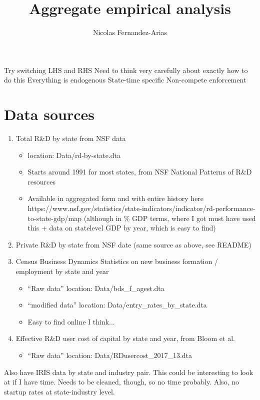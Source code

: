 \documentclass[7pt,english]{article}
\theoremstyle{remark}
\begin{document}
\title{Aggregate empirical analysis}
\author{Nicolas Fernandez-Arias}
\maketitle

Try switching LHS and RHS
Need to think very carefully about exactly how to do this
Everything is endogenous
State-time specific Non-compete enforcement 

\section{Data sources}

\begin{enumerate}
	\item Total R\&D by state from NSF data
	\begin{itemize}
		\item location: Data/rd-by-state.dta
		\item Starts around 1991 for most states, from NSF National Patterns of R\&D resources
		\item Available in aggregated form and with entire history here https://www.nsf.gov/statistics/state-indicators/indicator/rd-performance-to-state-gdp/map (although in \% GDP terms, where I got must have used this + data on statelevel GDP by year, which is easy to find)
	\end{itemize}
	\item Private R\&D by state from NSF date (same source as above, see README)
	\item Census Business Dynamics Statistics on new business formation / employment by state and year
	\begin{itemize}
		\item ``Raw data'' location: Data/bds\_f\_agest.dta
		\item ``modified data'' location: Data/entry\_rates\_by\_state.dta
		\item Easy to find online I think...
	\end{itemize}
	\item Effective R\&D user cost of capital by state and year, from Bloom et al.
	\begin{itemize}
		\item ``Raw data'' location: Data/RDusercost\_2017\_13.dta
	\end{itemize}
\end{enumerate}

Also have IRIS data by state and industry pair. This could be interesting to look at if I have time. Needs to be cleaned, though, so no time probably. Also, no startup rates at state-industry level. 
\end{document}
